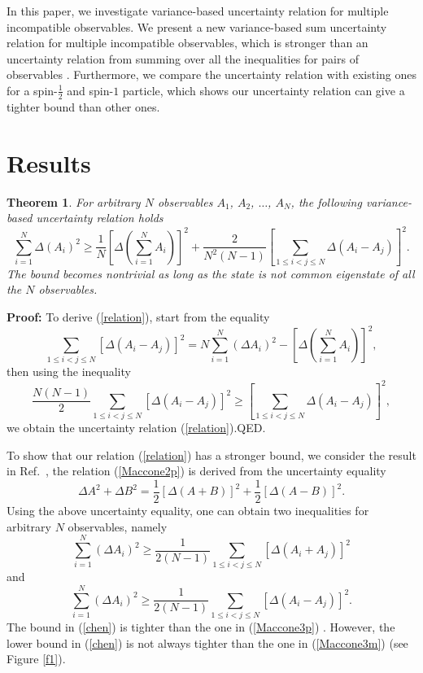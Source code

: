 \documentclass[fleqn,10pt]{wlscirep}
\newtheorem{theorem}{Theorem}
\begin{document}
In this paper, we investigate variance-based uncertainty relation for multiple incompatible observables. We present a new variance-based sum uncertainty relation for multiple incompatible observables, which is stronger than an uncertainty relation from summing over all the inequalities for pairs of observables \cite{mp}. Furthermore, we compare the uncertainty relation with existing ones for a spin-$\frac{1}{2}$ and spin-$1$ particle, which shows our uncertainty relation can give a tighter bound than other ones.


\section*{Results}
\begin{theorem}
For arbitrary $N$ observables $A_{1}$, $A_{2}$, $\ldots$, $A_{N}$, the following variance-based uncertainty relation holds
\begin{equation}\label{relation}
\sum^N_{i=1}\Delta(A_i)^2\geq
\frac{1}{N}\left[\Delta(\sum^N_{i=1}A_i)\right]^2
+\frac{2}{N^2(N-1)}\left[\sum_{1\leq i<j\leq N}\Delta(A_i-A_j)\right]^2.
\end{equation}
The bound becomes nontrivial as long as the state is not common eigenstate of all the $N$ observables.
\end{theorem}

{\bf Proof:} To derive (\ref{relation}), start from the equality
\begin{equation}\label{relation1}
\sum_{1\leq i<j\leq N}\left[\Delta(A_{i}-A_{j})\right]^{2}=N \sum_{i=1}^{N}(\Delta A_{i})^{2}-\left[\Delta(\sum_{i=1}^{N}A_{i})\right]^{2},
\end{equation}
then using the inequality
\begin{equation}\label{relation2}
\frac{N(N-1)}{2}\sum_{1\leq i<j\leq N}\left[\Delta(A_{i}-A_{j})\right]^{2} \geq\left[\sum_{1\leq i<j\leq N}\Delta(A_{i}-A_{j})\right]^{2},
\end{equation}
we obtain the uncertainty relation (\ref{relation}).QED.

To show that our relation (\ref{relation}) has a stronger bound, we consider the result in Ref.~, the relation (\ref{Maccone2p}) is derived from the uncertainty equality
%
\begin{equation}
\Delta A^{2}+\Delta B^{2}=\frac{1}{2}[\Delta(A+B)]^2+\frac{1}{2}[\Delta(A-B)]^2.
\end{equation}
%
Using the above uncertainty equality, one can obtain two inequalities for arbitrary $N$ observables, namely
%
%
\begin{equation}\label{Maccone3p}
\sum_{i=1}^{N}(\Delta A_{i})^{2}\geq\frac{1}{2(N-1)}\sum_{1\leq i<j\leq N}[\Delta(A_{i}+A_{j})]^{2}
\end{equation}
and
%
%
\begin{equation}\label{Maccone3m}
\sum_{i=1}^{N}(\Delta A_{i})^{2}\geq\frac{1}{2(N-1)}\sum_{1\leq i<j\leq N}[\Delta(A_{i}-A_{j})]^{2}.
\end{equation}
%
The bound in (\ref{chen}) is tighter than the one in (\ref{Maccone3p}) \cite{chenfei}. However, the lower bound in (\ref{chen}) is  not always tighter than the one in (\ref{Maccone3m}) (see Figure \ref{f1}).
\end{document}
